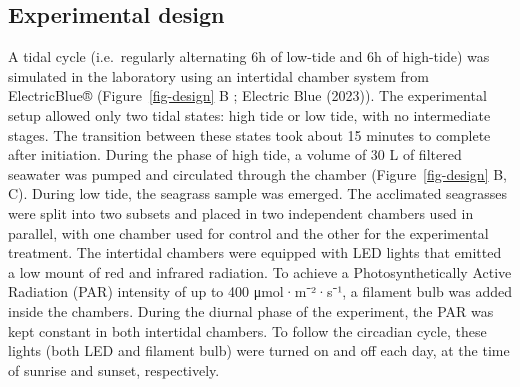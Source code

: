 \documentclass[
  letterpaper,
  DIV=11,
  numbers=noendperiod]{scrartcl}
\begin{document}
\subsection{Experimental design}\label{experimental-design}

A tidal cycle (i.e.~regularly alternating 6h of low-tide and 6h of
high-tide) was simulated in the laboratory using an intertidal chamber
system from ElectricBlue® (Figure~\ref{fig-design} B ; Electric Blue
(2023)). The experimental setup allowed only two tidal states: high tide
or low tide, with no intermediate stages. The transition between these
states took about 15 minutes to complete after initiation. During the
phase of high tide, a volume of 30 L of filtered seawater was pumped and
circulated through the chamber (Figure~\ref{fig-design} B, C). During
low tide, the seagrass sample was emerged. The acclimated seagrasses
were split into two subsets and placed in two independent chambers used
in parallel, with one chamber used for control and the other for the
experimental treatment. The intertidal chambers were equipped with LED
lights that emitted a low mount of red and infrared radiation. To
achieve a Photosynthetically Active Radiation (PAR) intensity of up to
400 μmol·m⁻²·s⁻¹, a filament bulb was added inside the chambers. During
the diurnal phase of the experiment, the PAR was kept constant in both
intertidal chambers. To follow the circadian cycle, these lights (both
LED and filament bulb) were turned on and off each day, at the time of
sunrise and sunset, respectively.
\end{document}
